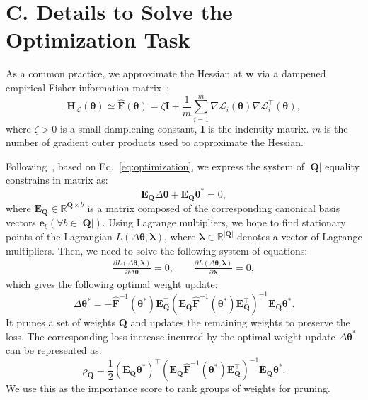 \documentclass[letterpaper]{article} %
\begin{document}
\section{C. Details to Solve the Optimization Task}\label{app: optim}
As a common practice, we approximate the Hessian at $\bm{w}$ via a dampened empirical Fisher information matrix~\citep{hassibi1992second}:
\begin{equation}
    \bm{H}_\mathcal{L}(\bm\theta) \simeq \hat{\bm{F}}(\bm\theta) = \zeta\bm{I} + \frac{1}{m}\sum_{i = 1}^{m} \nabla \mathcal{L}_i (\bm\theta) \nabla \mathcal{L}_i^{\top}(\bm{\theta}),
\end{equation}
where $\zeta > 0$ is a small damplening constant, $\bm{I}$ is the indentity matrix. $m$ is the number of gradient outer products used to approximate the Hessian.

Following~\citet{kurtic2022optimal}, based on Eq.~\eqref{eq:optimization}, we express the system of $|\bm{Q}|$ equality constrains in matrix as:
\begin{equation}
    \bm{E}_{\bm{Q}} \Delta \bm{\theta} + \bm{E}_{\bm{Q}} \bm{\theta}^\ast = 0,
\end{equation}
where $\bm{E}_{\bm{Q}} \in \mathbb{R}^{\bm{Q}\times b}$ is a matrix composed of the corresponding canonical basis vectors $\bm{e}_b (\forall b \in |\bm{Q}|)$. Using Lagrange multipliers, we hope to find stationary points of the Lagrangian $L(\Delta \bm{\theta}, \bm\lambda)$, where $\bm{\lambda} \in \mathbb{R}^{|\bm{Q}|}$ denotes a vector of Lagrange multipliers. Then, we need to solve the following system of equations:
\begin{equation}\label{eq:lagrange}
\begin{aligned}
    \frac{\partial L (\Delta \bm{\theta}, \bm{\lambda})}{\partial \Delta \bm{\theta}} = 0, \quad\quad
    \frac{\partial L (\Delta \bm{\theta}, \bm{\lambda})}{\partial \bm{\lambda}} = 0,
\end{aligned}
\end{equation}
which gives the following optimal weight update:
\begin{equation}
    \Delta \bm{\theta}^\ast = -\hat{\bm{F}}^{-1}(\bm{\theta}^\ast)\bm{E}_{\bm{Q}}^{\top}(\bm{E}_{\bm{Q}}\hat{\bm{F}}^{-1}(\bm{\theta}^\ast)\bm{E}_{\bm{Q}}^{\top})^{-1}\bm{E}_{\bm{Q}}\bm\theta^{\ast}.
\end{equation}
It prunes a set of weights $\bm{Q}$ and updates the remaining weights to preserve the loss. The corresponding loss increase incurred by the optimal weight update $\Delta\bm{\theta}^{\ast}$ can be represented as:
\begin{equation}
    \rho_{\bm{Q}} = \frac{1}{2}(\bm{E}_{\bm{Q}}\bm{\theta}^\ast)^\top (\bm{E}_{\bm{Q}}\hat{\bm{F}}^{-1}(\bm{\theta}^{\ast})\bm{E}_{\bm{Q}}^{\top})^{-1} \bm{E}_{\bm{Q}} \bm{\theta}^{\ast}.
\end{equation}
We use this as the importance score to rank groups of weights for pruning.
\end{document}
